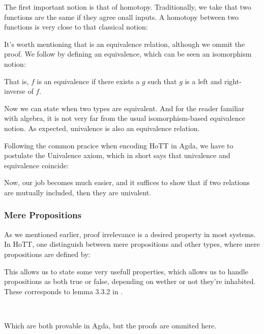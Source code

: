   The first important notion is that of homotopy. Traditionally, we take that two functions are
  the same if they agree onall inputs. A homotopy between two functions is very close to that
  classical notion:
  
  
  It's worth mentioning that \F{\_\~{}\_} is an equivalence relation, although we ommit the proof.
  We follow by defining an equivalence, which can be seen an isomorphism notion:
  
  
  That is, $f$ is an equivalence if there exists a $g$ such that $g$ is a left and right-inverse
  of $f$.
  
  Now we can state when two types are equivalent. And for the reader familiar with algebra, it is
  not very far from the usual isomorphism-based equivalence notion. As expected, univalence is
  also an equivalence relation.
  
  
  Following the common pracice when encoding HoTT in Agda, we have to postulate the Univalence
  axiom, which in short says that univalence and equivalence coincide:
  
  
  Now, our job becomes much easier, and it suffices to show that if two relations are
  mutually included, then they are univalent.
  
  \subsubsection{Mere Propositions}
  
  As we mentioned earlier, proof irrelevance is a desired property in most systems. In HoTT,
  one distinguish between mere propositions and other types, where mere propositions
  are defined by:
  
  
  This allows us to state some very usefull properties, which allows us to handle propositions
  as both true or false, depending on wether or not they're inhabited. These corresponds to
  lemma 3.3.2 in \cite{hottbook}.
  
  \\
  
  Which are both provable in Agda, but the proofs are ommited here.
  
